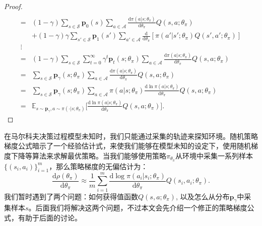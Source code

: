\begin{proof}
\begin{align*}
            [\pi(a' \vert s'; \theta_\pi) Q(s', a'; \theta_\pi)]\\
        =& (1 - \gamma) \sum_{s \in \mathcal{S}} 
            \mathbf{p}_0(s) \sum_{a \in \mathcal{A}} 
            \frac{\mathrm{d}\pi(a \vert s; \theta_\pi)}{\mathrm{d} \theta_\pi}
            Q(s, a; \theta_\pi)\\
        & + (1 - \gamma)\gamma \sum_{s' \in \mathcal{S}} 
            \mathbf{p}_1(s') \sum_{a' \in \mathcal{A}} 
            \frac{\mathrm{d}}{\mathrm{d} \theta_\pi}
                [\pi(a' \vert s'; \theta_\pi) Q(s', a'; \theta_\pi)]\\
        \vdots& \\
        =& (1 - \gamma)\sum_{s \in \mathcal{S}} \sum^{\infty}_{t = 0} 
            \gamma^t \mathbf{p}_t(s; \theta_\pi)
            \sum_{a \in \mathcal{A}} 
            \frac{\mathrm{d}\pi(a \vert s; \theta_\pi)}{\mathrm{d} \theta_\pi}
                Q(s, a; \theta_\pi) \\
        =& \sum_{s \in \mathcal{S}} \mathbf{p}_{\gamma}(s; \theta_\pi)
            \sum_{a \in \mathcal{A}} 
            \frac{\mathrm{d}\pi(a \vert s; \theta_\pi)}{\mathrm{d} \theta_\pi}
                Q(s, a; \theta_\pi) \\
        =& \sum_{s \in \mathcal{S}} \mathbf{p}_{\gamma}(s; \theta_\pi)
            \sum_{a \in \mathcal{A}} \pi(a \vert s; \theta_\pi) 
            \frac{\mathrm{d}\ln\pi(a \vert s; \theta_\pi)}{\mathrm{d} \theta_\pi}
                Q(s, a; \theta_\pi) \\
        =& \mathbb{E}_{s \sim \mathbf{p}_\gamma, a \sim \pi(\cdot \vert s; \theta_\pi)}
        \bigg[\frac{\mathrm{d} \ln \pi(a \vert s; \theta_\pi)}
        {\mathrm{d} \theta_\pi} Q(s, a; \theta_\pi)\bigg].
    \end{align*}
\end{proof}

在马尔科夫决策过程模型未知时，我们只能通过采集的轨迹来探知环境。随机策略梯度公式暗示了一个经验估计式，来使我们能够在模型未知的设定下，使用随机梯度下降等算法来求解最优策略。当我们能够使用策略$\pi_{\theta_\pi}$从环境中采集一系列样本$\{(s_i, a_i)\}^m_{i=1}$，那么策略梯度的无偏估计为：
\begin{equation}
    \frac{\mathrm{d} \rho(\theta_\pi)}{\mathrm{d} \theta_\pi}
    \approx \frac{1}{m} \sum^m_{i=1} 
    \frac{\mathrm{d} \log \pi(a_i \vert s_i; \theta_\pi)}
        {\mathrm{d} \theta_\pi} Q(s_i, a_i; \theta_\pi).
\end{equation}
我们暂时遇到了两个问题：如何获得值函数$Q(s, a; \theta_\pi)$, 以及怎么从分布$\mathbf{p}_{\gamma}$中采集样本$s$。后面我们将解决这两个问题，不过本文会先介绍一个修正的策略梯度公式，有助于后面的讨论。

